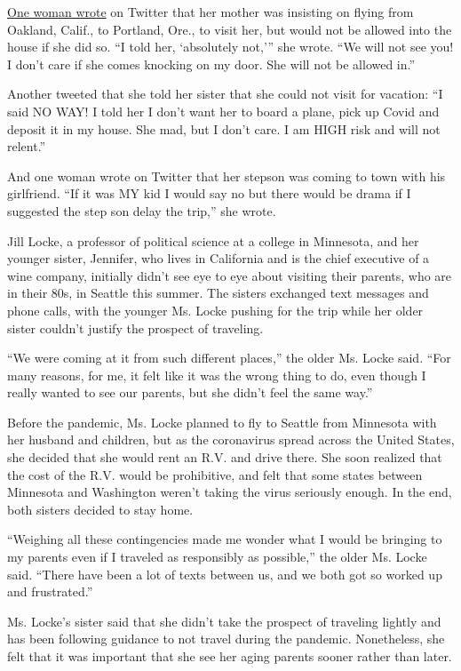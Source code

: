 \href{https://twitter.com/cw_janene/status/1281093891727347712}{One
woman wrote} on Twitter that her mother was insisting on flying from
Oakland, Calif., to Portland, Ore., to visit her, but would not be
allowed into the house if she did so. ``I told her, `absolutely not,'''
she wrote. ``We will not see you! I don't care if she comes knocking on
my door. She will not be allowed in.''

Another tweeted that she told her sister that she could not visit for
vacation: ``I said NO WAY! I told her I don't want her to board a plane,
pick up Covid and deposit it in my house. She mad, but I don't care. I
am HIGH risk and will not relent.''

And one woman wrote on Twitter that her stepson was coming to town with
his girlfriend. ``If it was MY kid I would say no but there would be
drama if I suggested the step son delay the trip,'' she wrote.

Jill Locke, a professor of political science at a college in Minnesota,
and her younger sister, Jennifer, who lives in California and is the
chief executive of a wine company, initially didn't see eye to eye about
visiting their parents, who are in their 80s, in Seattle this summer.
The sisters exchanged text messages and phone calls, with the younger
Ms. Locke pushing for the trip while her older sister couldn't justify
the prospect of traveling.

``We were coming at it from such different places,'' the older Ms. Locke
said. ``For many reasons, for me, it felt like it was the wrong thing to
do, even though I really wanted to see our parents, but she didn't feel
the same way.''

Before the pandemic, Ms. Locke planned to fly to Seattle from Minnesota
with her husband and children, but as the coronavirus spread across the
United States, she decided that she would rent an R.V. and drive there.
She soon realized that the cost of the R.V. would be prohibitive, and
felt that some states between Minnesota and Washington weren't taking
the virus seriously enough. In the end, both sisters decided to stay
home.

``Weighing all these contingencies made me wonder what I would be
bringing to my parents even if I traveled as responsibly as possible,''
the older Ms. Locke said. ``There have been a lot of texts between us,
and we both got so worked up and frustrated.''

Ms. Locke's sister said that she didn't take the prospect of traveling
lightly and has been following guidance to not travel during the
pandemic. Nonetheless, she felt that it was important that she see her
aging parents sooner rather than later.

